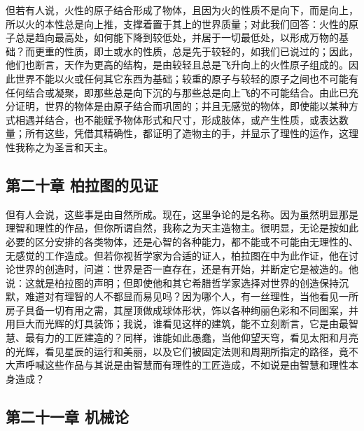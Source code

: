 但若有人说，火性的原子结合形成了物体，且因为火的性质不是向下，而是向上，所以火的本性总是向上推，支撑着置于其上的世界质量；对此我们回答：火性的原子总是趋向最高处，如何能下降到较低处，并居于一切最低处，以形成万物的基础？而更重的性质，即土或水的性质，总是先于较轻的，如我们已说过的；因此，他们也断言，天作为更高的结构，是由较轻且总是飞升向上的火性原子组成的。因此世界不能以火或任何其它东西为基础；较重的原子与较轻的原子之间也不可能有任何结合或凝聚，即那些总是向下沉的与那些总是向上飞的不可能结合。由此已充分证明，世界的物体是由原子结合而巩固的；并且无感觉的物体，即使能以某种方式相遇并结合，也不能赋予物体形式和尺寸，形成肢体，或产生性质，或表达数量；所有这些，凭借其精确性，都证明了造物主的手，并显示了理性的运作，这理性我称之为圣言和天主。\par


\subsection{第二十章 柏拉图的见证}

但有人会说，这些事是由自然所成。现在，这里争论的是名称。因为虽然明显那是理智和理性的作品，但你所谓自然，我称之为天主造物主。很明显，无论是按如此必要的区分安排的各类物体，还是心智的各种能力，都不能或不可能由无理性的、无感觉的工作造成。但若你视哲学家为合适的证人，柏拉图在中为此作证，他在讨论世界的创造时，问道：世界是否一直存在，还是有开始，并断定它是被造的。他说：这就是柏拉图的声明；但即使他和其它希腊哲学家选择对世界的创造保持沉默，难道对有理智的人不都显而易见吗？因为哪个人，有一丝理性，当他看见一所房子具备一切有用之需，其屋顶做成球体形状，饰以各种绚丽色彩和不同图案，并用巨大而光辉的灯具装饰；我说，谁看见这样的建筑，能不立刻断言，它是由最智慧、最有力的工匠建造的？同样，谁能如此愚蠢，当他仰望天穹，看见太阳和月亮的光辉，看见星辰的运行和美丽，以及它们被固定法则和周期所指定的路径，竟不大声呼喊这些作品与其说是由智慧而有理性的工匠造成，不如说是由智慧和理性本身造成？\par


\subsection{第二十一章 机械论}

